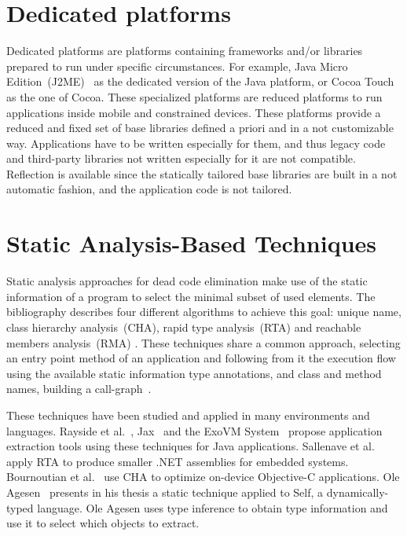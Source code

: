 
\section{Dedicated platforms}%
\label{section:static_selection_rw}

Dedicated platforms are platforms containing frameworks and/or libraries prepared to run under specific circumstances. For example, Java Micro Edition~(J2ME)~\cite{JavaME} as the dedicated version of the Java platform, or Cocoa Touch as the one of Cocoa. These specialized platforms are reduced platforms to run applications inside mobile and constrained devices. These platforms provide a reduced and fixed set of base libraries defined a priori and in a not customizable way. Applications have to be written especially for them, and thus legacy code and third-party libraries not written especially for it are not compatible. Reflection is available since the statically tailored base libraries are built in a not automatic fashion, and the application code is not tailored.

\section{Static Analysis-Based Techniques}\label{section:static_rw}

Static analysis approaches for dead code elimination make use of the static information of a program to select the minimal subset of used elements. The bibliography describes four different algorithms to achieve this goal: unique name, class hierarchy analysis~(CHA), rapid type analysis~(RTA) and reachable members analysis~(RMA) \cite{Baco96a, Titz06a}. These techniques share a common approach, selecting an entry point method of an application and following from it the execution flow using the available static information \ie type annotations, and class and method names, building a call-graph~\cite{Grov97a}.

These techniques have been studied and applied in many environments and languages. Rayside et al.~\cite{Rays02a}, Jax~\cite{Tip03a} and the ExoVM System~\cite{Titz06a} propose application extraction tools using these techniques for Java applications. Sallenave et al.~\cite{Sall10a} apply RTA to produce smaller .NET assemblies for embedded systems. Bournoutian et al.~\cite{Bour14a} use CHA to optimize on-device Objective-C applications. Ole Agesen~\cite{Ages96a} presents in his thesis a static technique applied to Self, a dynamically-typed language. Ole Agesen uses type inference to obtain type information and use it to select which objects to extract.

